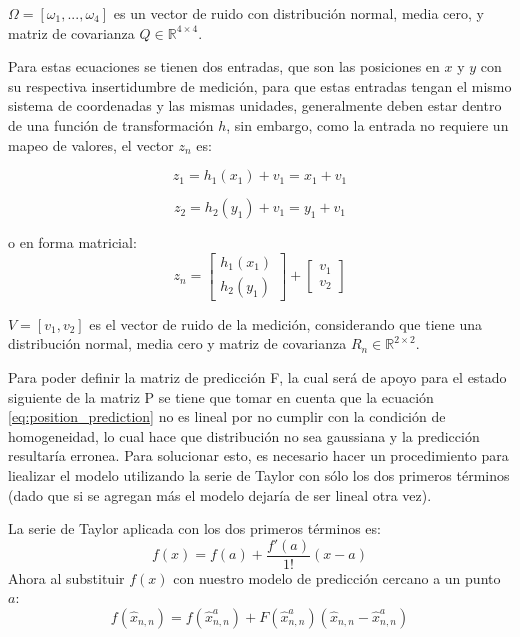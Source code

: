 $\Omega = [\omega_1, ... ,\omega_4]$ es un vector de ruido con distribución normal, media cero, y matriz de covarianza $Q\in \mathbb{R}^{4\times 4}$.

Para estas ecuaciones se tienen dos entradas, que son las posiciones en $x$ y $y$ con su respectiva insertidumbre de medición, para que estas entradas tengan el mismo sistema de coordenadas y las mismas unidades, generalmente deben estar dentro de una función de transformación $h$, sin embargo, como la entrada no requiere un mapeo de valores, el vector $z_n$ es:

\begin{equation}
z_1 = h_1(x_1) + v_1 = x_1 + v_1 
\label{eq:x_entry}
\end{equation}

\begin{equation}
z_2 = h_2(y_1) + v_1 = y_1 + v_1 
\label{eq:y_entry}
\end{equation}

o en forma matricial:
\begin{equation}
z_n =
\begin{bmatrix}
h_1(x_1) \\ 
h_2(y_1)
\end{bmatrix}
+
\begin{bmatrix}
v_1 \\ 
v_2
\end{bmatrix}
\end{equation}

$V = [v_1, v_2]$ es el vector de ruido de la medición, considerando que tiene una distribución normal, media cero y matriz de covarianza $R_n\in\mathbb{R}^{2\times 2}$.

    Para poder definir la matriz de predicción F, la cual será de apoyo para el estado siguiente de la matriz P se tiene que tomar en cuenta que la ecuación \ref{eq:position_prediction} no es lineal por no cumplir con la condición de homogeneidad, lo cual hace que distribución no sea gaussiana y la predicción resultaría erronea. Para solucionar esto, es necesario hacer un procedimiento para liealizar el modelo utilizando la serie de Taylor con sólo los dos primeros términos (dado que si se agregan más el modelo dejaría de ser lineal otra vez).
	
La serie de Taylor aplicada con los dos primeros términos es:
\begin{equation}
	f(x) = f(a) + \frac{f'(a)}{1!} (x-a)
\end{equation} 
Ahora al substituir $f(x)$ con nuestro modelo de predicción cercano a un punto $a$:
\begin{equation}
	f(\hat{x}_{n,n}) = f(\hat{x}^a_{n,n}) + F(\hat{x}^a_{n,n})(\hat{x}_{n,n} - \hat{x}^a_{n,n})
\end{equation}

